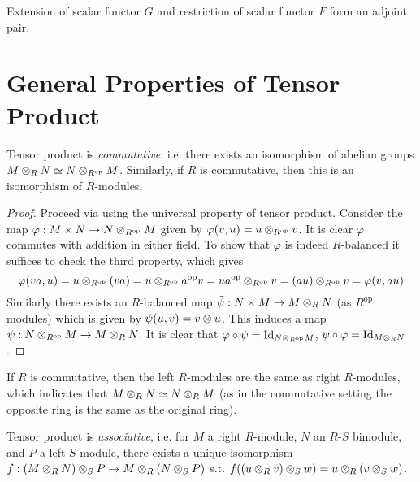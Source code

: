 \documentclass{article}
\begin{document}
\begin{remark}
    Extension of scalar functor $G$ and restriction of scalar functor $F$ form an adjoint pair.
\end{remark}

\section{General Properties of Tensor Product}

\def\op{\text{op}}

\begin{proposition}
    Tensor product is \emph{commutative}, i.e. there exists an isomorphism of abelian groups $M \tensor_R N \simeq N \tensor_{R^{\op}} M$. Similarly, if $R$ is commutative, then this is an isomorphism of $R$-modules.
\end{proposition}

\begin{proof}
    Proceed via using the universal property of tensor product. Consider the map $\varphi: M \times N \to N \tensor_{R^{\op}} M$ given by $\varphi(v, u) = u \tensor_{R^{\op}} v$. It is clear $\varphi$ commutes with addition in either field. To show that $\varphi$ is indeed $R$-balanced it suffices to check the third property, which gives 
    \[
        \varphi(va, u) = u \tensor_{R^{\op}} (va) = u \tensor_{R^\op} a^\op v = u a^\op \tensor_{R^\op} v =(au) \tensor_{R^\op} v = \varphi(v, au)
    \]
    Similarly there exists an $R$-balanced map $\tilde{\psi}: N \times M \to M \otimes_R N$ (as $R^\op$ modules) which is given by $\psi(u, v) = v \otimes u$. This induces a map $\psi: N \tensor_{R^\op} M \to M \tensor_R N$. It is clear that $\varphi \circ \psi = \Id_{N \tensor_{R^\op} M}$, $\psi \circ \varphi = \mathrm{Id}_{M \otimes_R N}$. 
\end{proof}

\begin{remark}
    If $R$ is commutative, then the left $R$-modules are the same as right $R$-modules, which indicates that $M \otimes_R N \simeq N \otimes_R M$ (as in the commutative setting the opposite ring is the same as the original ring).
\end{remark}

\begin{proposition}
    Tensor product is \emph{associative}, i.e. for $M$ a right $R$-module, $N$ an $R$-$S$ bimodule, and $P$ a left $S$-module, there exists a unique isomorphism $f: (M \otimes_R N) \otimes_S P \to M \otimes_R (N \otimes_S P)$ s.t. $f((u \otimes_R v) \otimes_S w) = u \otimes_R (v \otimes_S w)$.
\end{proposition}
\end{document}
